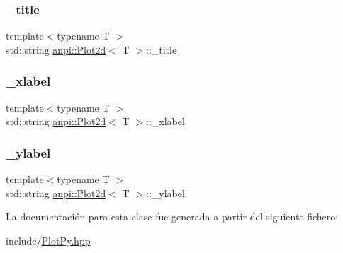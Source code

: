 \mbox{\label{classanpi_1_1Plot2d_a95db211aec89f0e66b28ad01ce74d2ae}} 
\subsubsection{\texorpdfstring{\+\_\+title}{\_title}}
{\footnotesize\ttfamily template$<$typename T $>$ \\
std\+::string \hyperlink{classanpi_1_1Plot2d}{anpi\+::\+Plot2d}$<$ T $>$\+::\+\_\+title\hspace{0.3cm}{\ttfamily [private]}}

\mbox{\label{classanpi_1_1Plot2d_a6537d8a33bb34a55a3e2c9e052eba10e}} 
\subsubsection{\texorpdfstring{\+\_\+xlabel}{\_xlabel}}
{\footnotesize\ttfamily template$<$typename T $>$ \\
std\+::string \hyperlink{classanpi_1_1Plot2d}{anpi\+::\+Plot2d}$<$ T $>$\+::\+\_\+xlabel\hspace{0.3cm}{\ttfamily [private]}}

\mbox{\label{classanpi_1_1Plot2d_a82ade43ab875298e8b84eceab8bf8a35}} 
\subsubsection{\texorpdfstring{\+\_\+ylabel}{\_ylabel}}
{\footnotesize\ttfamily template$<$typename T $>$ \\
std\+::string \hyperlink{classanpi_1_1Plot2d}{anpi\+::\+Plot2d}$<$ T $>$\+::\+\_\+ylabel\hspace{0.3cm}{\ttfamily [private]}}



La documentación para esta clase fue generada a partir del siguiente fichero\+:\begin{DoxyCompactItemize}
\item 
include/\hyperlink{PlotPy_8hpp}{Plot\+Py.\+hpp}\end{DoxyCompactItemize}

